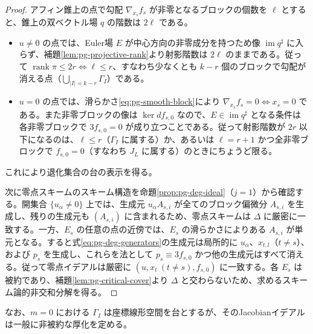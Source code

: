 \begin{proof}
アフィン錐上の点で勾配 $\nabla_{x_s}f_s$ が非零となるブロックの個数を $\ell$ とすると、錐上の双ベクトル場 $q$ の階数は $2\ell$ である。
\begin{itemize}
  \item $u\neq0$ の点では、Euler場 $E$ が中心方向の非零成分を持つため像 $\operatorname{im}q^\sharp$ に入らず、補題\ref{lem:pg-projective-rank}より射影階数は $2\ell$ のままである。従って $\operatorname{rank}\pi\le 2r\iff \ell\le r$、すなわち少なくとも $k-r$ 個のブロックで勾配が消える点（$\bigcup_{|I|=k-r}\Gamma_I$）である。
  \item $u=0$ の点では、滑らかさ\eqref{eq:pg-smooth-block}により $\nabla_{x_s}f_s=0\iff x_s=0$ である。また非零ブロックの像は $\ker df_{s,0}$ なので、$E\in\operatorname{im}q^\sharp$ となる条件は各非零ブロックで $3f_{s,0}=0$ が成り立つことである。従って射影階数が $2r$ 以下になるのは、$\ell\le r$（$\Gamma_I$ に属する）か、あるいは $\ell=r+1$ かつ全非零ブロックで $f_{s,0}=0$（すなわち $J_L$ に属する）のときにちょうど限る。
\end{itemize}
これにより退化集合の台の表示を得る。

次に零点スキームのスキーム構造を命題\ref{prop:pg-deg-ideal}（$j=1$）から確認する。開集合 $\{u_\alpha\ne0\}$ 上では、生成元 $u_\alpha A_{s,i}$ が全てのブロック偏微分 $A_{s,i}$ を生成し、残りの生成元も $(A_{s,i})$ に含まれるため、零点スキームは $\Delta$ に厳密に一致する。一方、$E_s$ の任意の点の近傍では、$E_s$ の滑らかさによりある $A_{s,i}$ が単元となる。すると式\eqref{eq:pg-deg-generators}の生成元は局所的に $u_\alpha$、$x_{t,l}$（$t\ne s$）、および $p_s$ を生成し、これらを法として $p_s\equiv 3f_{s,0}$ かつ他の生成元はすべて消える。従って零点イデアルは厳密に $(u,x_t\ (t\ne s),f_{s,0})$ に一致する。各 $E_s$ は被約であり、補題\ref{lem:pg-critical-cover}より $\Delta$ と交わらないため、求めるスキーム論的非交和分解を得る。
\end{proof}

なお、$m=0$ における $\Gamma_I$ は座標線形空間を台とするが、そのJacobianイデアルは一般に非被約な厚化を定める。

